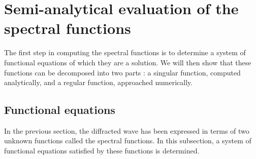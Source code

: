 \section{Semi-analytical evaluation of the spectral functions}
\label{section4}
The first step in computing the spectral functions is to determine a system of functional equations of which they are a solution. We will then show that these functions can be decomposed into two parts : a singular function, computed analytically, and a regular function, approached numerically.
\subsection{Functional equations}
In the previous section, the diffracted wave has been expressed in terms of two unknown functions called the spectral functions. In this subsection, a system of functional equations satisfied by these functions is determined.

